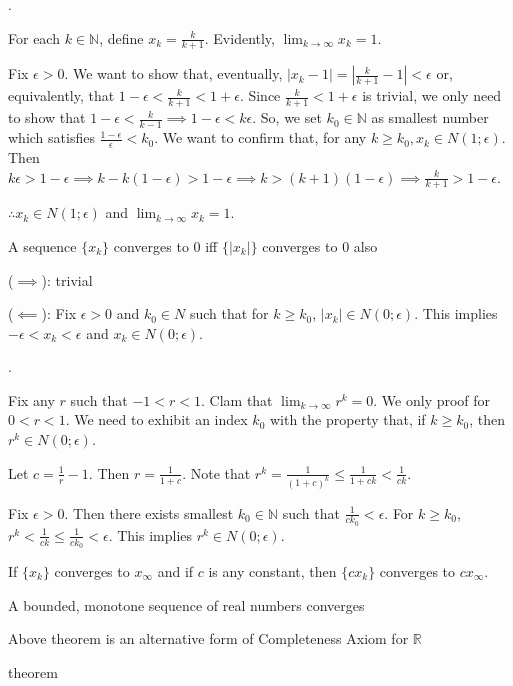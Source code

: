 \documentclass[8pt]{beamer}
\newcommand{\mbb}[1]{\mathbb{#1}}
\newcommand{\abs}[1]{\left\lvert #1 \right\rvert}
\begin{document}
\begin{frame}{.}
    \begin{example}
        For each $k \in \mbb{N}$, define $x_k = \frac{k}{k+1}$.
        Evidently, $\lim_{k \to \infty} x_k = 1$.

        Fix $\epsilon > 0$. We want to show that, eventually, $\abs{x_k -1} = \abs{\frac{k}{k+1} - 1} < \epsilon$ or, equivalently, that $1 - \epsilon < \frac{k}{k+1} < 1 + \epsilon$.
        Since $\frac{k}{k+1} < 1+\epsilon$ is trivial, we only need to show that $1 - \epsilon < \frac{k}{k-1} \implies 1 - \epsilon < k\epsilon$.
        So, we set $k_0 \in \mbb{N}$ as smallest number which satisfies $\frac{1-\epsilon}{\epsilon} < k_0$.
        We want to confirm that, for any $k \geq k_0, x_k \in N(1;\epsilon)$.
        Then $k\epsilon > 1 - \epsilon \implies k - k(1 - \epsilon) > 1-\epsilon \implies k > (k+1)(1-\epsilon) \implies \frac{k}{k+1} > 1- \epsilon$.

        $\therefore x_k \in N(1;\epsilon)$ and $\lim_{k \to \infty} x_k = 1$.
    \end{example}

    \begin{theorem}
        A sequence $\{x_k\}$ converges to $0$ iff $\{\abs{x_k}\}$ converges to $0$ also

        ($\implies$): trivial

        ($\impliedby$): Fix $\epsilon >0$ and $k_0 \in N$ such that for $k \geq k_0$, $\abs{x_k} \in N(0; \epsilon)$.
        This implies $-\epsilon < x_k < \epsilon$ and $x_k \in N(0; \epsilon)$.
    \end{theorem}
\end{frame}

\begin{frame}{.}
    \begin{example}
        Fix any $r$ such that $-1 < r < 1$.
        Clam that $\lim_{k \to \infty} r^k = 0$.
        We only proof for $0< r< 1$.
        We need to exhibit an index $k_0$ with the property that, if $k \geq k_0$, then $r^k \in N(0; \epsilon)$.

        Let $c = \frac{1}{r} -1$.
        Then $r = \frac{1}{1+c}$.
        Note that $r^k = \frac{1}{(1+c)^k} \leq \frac{1}{1 + ck} < \frac{1}{ck}$.

        Fix $\epsilon >0$.
        Then there exists smallest $k_0 \in \mbb{N}$ such that $\frac{1}{c k_0} < \epsilon$.
        For $k \geq k_0$, $r^k < \frac{1}{ck} \leq \frac{1}{c k_0} < \epsilon$.
        This implies $r^k \in N(0;\epsilon)$.
    \end{example}

    \begin{theorem}
        If $\{x_k\}$ converges to $x_\infty$ and if $c$ is any constant, then $\{cx_k\}$ converges to $cx_\infty$.
    \end{theorem}

    \begin{theorem}
        A bounded, monotone sequence of real numbers converges
    \end{theorem}

    Above theorem is an alternative form of Completeness Axiom for $\mbb{R}$
\end{frame}

\begin{frame}{theorem}


\end{frame}
\end{document}
